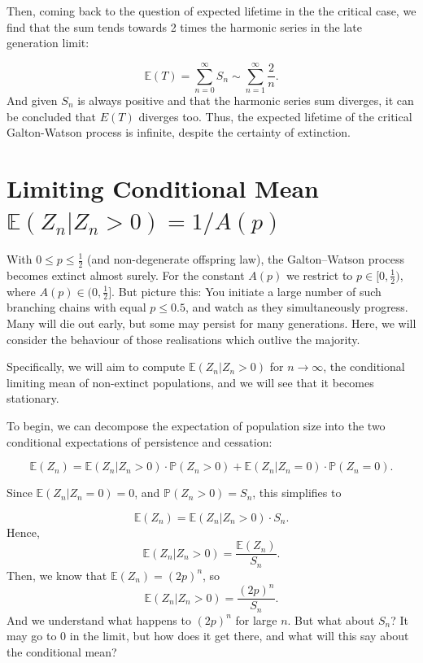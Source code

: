 \documentclass[11pt]{article}
\begin{document}
Then, coming back to the question of expected lifetime in the the critical case, we find that the sum tends towards 2 times the harmonic series in the late generation limit:

$$\mathbb{E}(T) = \sum_{n=0}^{\infty} S_n \sim \sum_{n=1}^{\infty} \frac{2}{n}.$$
And given $S_n$ is always positive and that the harmonic series sum diverges, it can be concluded that $E(T)$ diverges too. Thus, the expected lifetime of the critical Galton-Watson process is infinite, despite the certainty of extinction.






\section{Limiting Conditional Mean $\mathbb{E}(Z_n|Z_n>0) = 1/A(p)$}


With $0 \le p \le \tfrac12$ (and non-degenerate offspring law), the Galton--Watson process becomes extinct almost surely. For the constant $A(p)$ we restrict to $p\in[0,\tfrac12)$, where $A(p)\in(0,\tfrac12]$. But picture this: You 
initiate a large number of such branching chains with equal $p\leq 0.5$, and watch as they simultaneously progress. 
Many will die out early, but some may persist for many generations. Here, we will consider the behaviour of those realisations
which outlive the majority. 

Specifically, we will aim to compute $\mathbb{E}(Z_n|Z_n>0)$ for $n\to \infty$, the conditional limiting mean 
of non-extinct populations, and we will see that it becomes stationary.

\vspace{20pt}

\noindent
To begin, we can decompose the expectation of population size into the two conditional expectations of persistence and cessation: 

$$\mathbb{E}(Z_n) = \mathbb{E}(Z_n|Z_n>0)\cdot\mathbb{P}(Z_n>0) + \mathbb{E}(Z_n|Z_n=0)\cdot\mathbb{P}(Z_n=0).$$

\noindent
Since $\mathbb{E}(Z_n|Z_n=0) = 0$, and $\mathbb{P}(Z_n > 0) = S_n$, this simplifies to

$$\mathbb{E}(Z_n) = \mathbb{E}(Z_n|Z_n>0)\cdot S_n.$$
Hence,
$$\mathbb{E}(Z_n|Z_n>0) = \frac{\mathbb{E}(Z_n)}{S_n}.$$
Then, we know that $\mathbb{E}(Z_n) = (2p)^n$, so
$$\mathbb{E}(Z_n|Z_n>0) = \frac{(2p)^n}{S_n}.$$
And we understand what happens to $(2p)^n$ for large $n$. But what about $S_n$? It may go to 0 in the limit, but how does it get there, and what will this say about the conditional mean?
\end{document}
